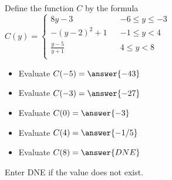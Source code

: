\documentclass{ximera}
\begin{document}
\begin{definition}
Define the function $C$ by the formula $C(y) =   
\left \{ \begin{aligned}     
8 y - 3 && -6 \leq y \leq -3 \\        
-(y-2)^2 + 1 && -1 \leq y < 4 \\      
\frac{y-5}{y+1} && 4 \leq y < 8\\       
\end{aligned} \right .$ 
\end{definition}






\begin{exercise}
\begin{itemize}
\item Evaluate $C(-5) = \answer{-43}$
\item Evaluate $C(-3) = \answer{-27}$
\item Evaluate $C(0) = \answer{-3}$
\item Evaluate $C(4) = \answer{-1/5}$
\item Evaluate $C(8) = \answer{DNE}$
\end{itemize}
Enter DNE if the value does not exist.
\end{exercise}
\end{document}
